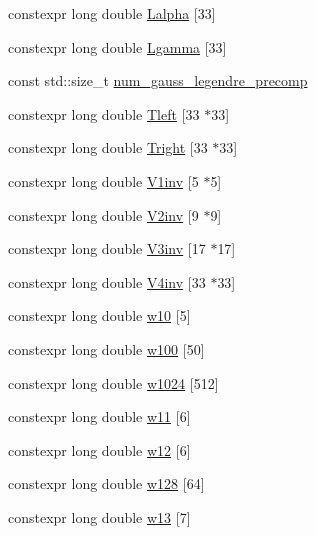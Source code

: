 \begin{DoxyCompactItemize}
\item 
constexpr long double \hyperlink{namespace____gnu__cxx_a6a28a325aceb8d1e4e70d68b1cdeb156}{Lalpha} \mbox{[}33\mbox{]}
\item 
constexpr long double \hyperlink{namespace____gnu__cxx_a8148a5d125951ff217becb9212005bea}{Lgamma} \mbox{[}33\mbox{]}
\item 
const std\+::size\+\_\+t \hyperlink{namespace____gnu__cxx_a6b3fdb3b976805e974e633eae91469ed}{num\+\_\+gauss\+\_\+legendre\+\_\+precomp}
\item 
constexpr long double \hyperlink{namespace____gnu__cxx_a7e499d0005aca8d0d6dd4eb30c0bc008}{Tleft} \mbox{[}33 $\ast$33\mbox{]}
\item 
constexpr long double \hyperlink{namespace____gnu__cxx_aa35b50708b727cd96920850c90482637}{Tright} \mbox{[}33 $\ast$33\mbox{]}
\item 
constexpr long double \hyperlink{namespace____gnu__cxx_abac562ad4a226ad8799434617959af3d}{V1inv} \mbox{[}5 $\ast$5\mbox{]}
\item 
constexpr long double \hyperlink{namespace____gnu__cxx_aa4b649154290c645f634d501d63fac0f}{V2inv} \mbox{[}9 $\ast$9\mbox{]}
\item 
constexpr long double \hyperlink{namespace____gnu__cxx_ac23b44065db55792c4f65364f34ee956}{V3inv} \mbox{[}17 $\ast$17\mbox{]}
\item 
constexpr long double \hyperlink{namespace____gnu__cxx_a19b55e8c50f41d9d0a5618653f960f5c}{V4inv} \mbox{[}33 $\ast$33\mbox{]}
\item 
constexpr long double \hyperlink{namespace____gnu__cxx_a3af4d95b4c212f870e055f3b9f3d8f71}{w10} \mbox{[}5\mbox{]}
\item 
constexpr long double \hyperlink{namespace____gnu__cxx_a58bd389f530494f8e59ed83d812baf89}{w100} \mbox{[}50\mbox{]}
\item 
constexpr long double \hyperlink{namespace____gnu__cxx_ac19ac482be7e2c7a347220d6ebb3172a}{w1024} \mbox{[}512\mbox{]}
\item 
constexpr long double \hyperlink{namespace____gnu__cxx_a01d11bac6e90e340d0594517fe76c751}{w11} \mbox{[}6\mbox{]}
\item 
constexpr long double \hyperlink{namespace____gnu__cxx_ae4bc25ed69411a1449962559460c3b83}{w12} \mbox{[}6\mbox{]}
\item 
constexpr long double \hyperlink{namespace____gnu__cxx_a41570e73743d8e9ce680ec4a2b627da5}{w128} \mbox{[}64\mbox{]}
\item 
constexpr long double \hyperlink{namespace____gnu__cxx_ada6939eb092714a9b14560ee1abe882c}{w13} \mbox{[}7\mbox{]}

\end{DoxyCompactItemize}
